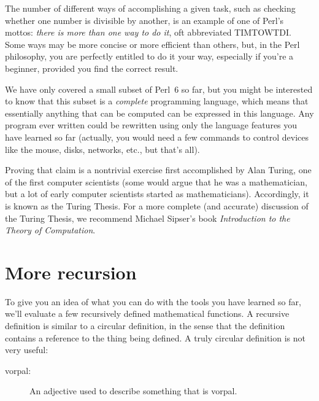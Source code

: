 The number of different ways of accomplishing a given task, 
such as checking whether one number is divisible 
by another, is an example of one of Perl's mottos: \emph{there is more than 
one way to do it}, oft abbreviated TIMTOWTDI. Some ways may be 
more concise or more efficient than others, but, in the Perl 
philosophy, you are perfectly entitled to do it your way, 
especially if you're a beginner, provided you find the correct 
result.

We have only covered a small subset of Perl~6 so far, but you 
might be interested to know that this subset is a {\em complete}
programming language, which means that essentially anything 
that can be computed can be expressed in this language.  
Any program ever written could be rewritten using only the 
language features you have learned so far (actually, you 
would need a few commands to control devices like the mouse, 
disks, networks, etc., but that's all).

Proving that claim is a nontrivial exercise first accomplished by Alan
Turing, one of the first computer scientists (some would argue that he
was a mathematician, but a lot of early computer scientists started as
mathematicians).  Accordingly, it is known as the Turing Thesis.
For a more complete (and accurate) discussion of the Turing Thesis,
we recommend Michael Sipser's book {\em Introduction to the
Theory of Computation}.

\section{More recursion}
\label{more.recursion}


To give you an idea of what you can do with the tools you have learned
so far, we'll evaluate a few recursively defined mathematical
functions.  A recursive definition is similar to a circular
definition, in the sense that the definition contains a reference to
the thing being defined.  A truly circular definition is not very
useful:

\begin{description}

\item[vorpal:] An adjective used to describe something that is vorpal.

\end{description}

